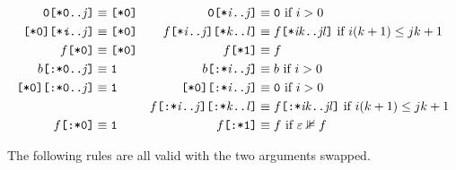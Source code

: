 \documentclass[a4paper,twoside,10pt,DIV=12]{scrreprt}
\newcommand{\FUSION}{\mathbin{\texttt{:}}}
\newcommand{\CONCAT}{\mathbin{\texttt{;}}}
\newcommand{\0}{\texttt{0}}
\newcommand{\1}{\texttt{1}}
\newcommand{\STAR}[1]{\texttt{[*#1]}}
\newcommand{\FSTAR}[1]{\texttt{[:*#1]}}
\newcommand{\eword}{\texttt{[*0]}}
\newcommand\var[1]{{\ttfamily\itshape #1}}
\newcommand\mvar[1]{\ensuremath{\mathit{#1}}}
\newcommand\samp[1]{`\texttt{#1}'}
\begin{document}
\begin{align*}
  \0\STAR{0..\mvar{j}} &\equiv \eword  &
  \0\STAR{\mvar{i}..\mvar{j}} &\equiv \0 \text{~if~}i>0 \\
  \eword\STAR{\var{i}..\mvar{j}} &\equiv \eword&
  f\STAR{\mvar{i}..\mvar{j}}\STAR{\mvar{k}..\mvar{l}} &\equiv f\STAR{\mvar{ik}..\mvar{jl}}\text{~if~}i(k+1)\le jk+1 \\
  f\STAR{0}&\equiv \eword &
  f\STAR{1}&\equiv f\\
  b\FSTAR{0..\mvar{j}} &\equiv \1  &
  b\FSTAR{\mvar{i}..\mvar{j}} &\equiv b \text{~if~}i>0 \\
  \eword\FSTAR{0..\mvar{j}} &\equiv \1&
  \eword\FSTAR{\mvar{i}..\mvar{j}} &\equiv \0\text{~if~}i>0 \\
  &&
  f\FSTAR{\mvar{i}..\mvar{j}}\FSTAR{\mvar{k}..\mvar{l}} &\equiv f\FSTAR{\mvar{ik}..\mvar{jl}}\text{~if~}i(k+1)\le jk+1 \\
  f\FSTAR{0}&\equiv \1 &
  f\FSTAR{1}&\equiv f\text{~if~}\varepsilon\nVDash f\\
\end{align*}

\noindent
The following rules are all valid with the two arguments swapped.
\end{document}
